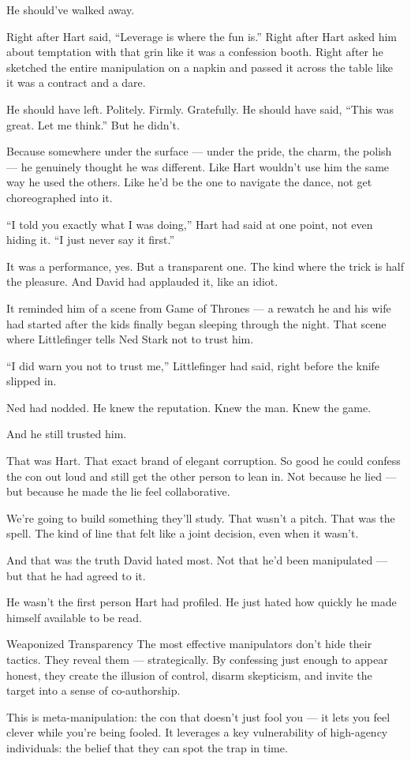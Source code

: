 He should’ve walked away.

Right after Hart said, “Leverage is where the fun is.”
Right after Hart asked him about temptation with that grin like it was a confession booth.
Right after he sketched the entire manipulation on a napkin and passed it across the table like it was 
a contract and a dare.

He should have left. Politely. Firmly. Gratefully.
He should have said, “This was great. Let me think.”
But he didn’t.

Because somewhere under the surface — under the pride, the charm, the polish — he genuinely thought he was different.
Like Hart wouldn’t use him the same way he used the others.
Like he’d be the one to navigate the dance, not get choreographed into it.

“I told you exactly what I was doing,” Hart had said at one point, not even hiding it.
“I just never say it first.”

It was a performance, yes. But a transparent one. The kind where the trick is half the pleasure.
And David had applauded it, like an idiot.

It reminded him of a scene from Game of Thrones — a rewatch he and his wife had started after the kids 
finally began sleeping through the night.
That scene where Littlefinger tells Ned Stark not to trust him.

“I did warn you not to trust me,” Littlefinger had said, right before the knife slipped in.

Ned had nodded. He knew the reputation. Knew the man. Knew the game.

And he still trusted him.

That was Hart. That exact brand of elegant corruption.
So good he could confess the con out loud and still get the other person to lean in.
Not because he lied — but because he made the lie feel collaborative.

We’re going to build something they’ll study.
That wasn’t a pitch. That was the spell.
The kind of line that felt like a joint decision, even when it wasn’t.

And that was the truth David hated most.
Not that he’d been manipulated — but that he had agreed to it.

He wasn’t the first person Hart had profiled.
He just hated how quickly he made himself available to be read.

\begin{PsychologicalSidebar}{Weaponized Transparency}
The most effective manipulators don’t hide their tactics. They reveal them — strategically.
By confessing just enough to appear honest, they create the illusion of control, disarm skepticism,
and invite the target into a sense of co-authorship.

This is meta-manipulation: the con that doesn’t just fool you — it lets you feel clever while you’re being fooled.
It leverages a key vulnerability of high-agency individuals: the belief that they can spot the trap in time.
\end{PsychologicalSidebar}







